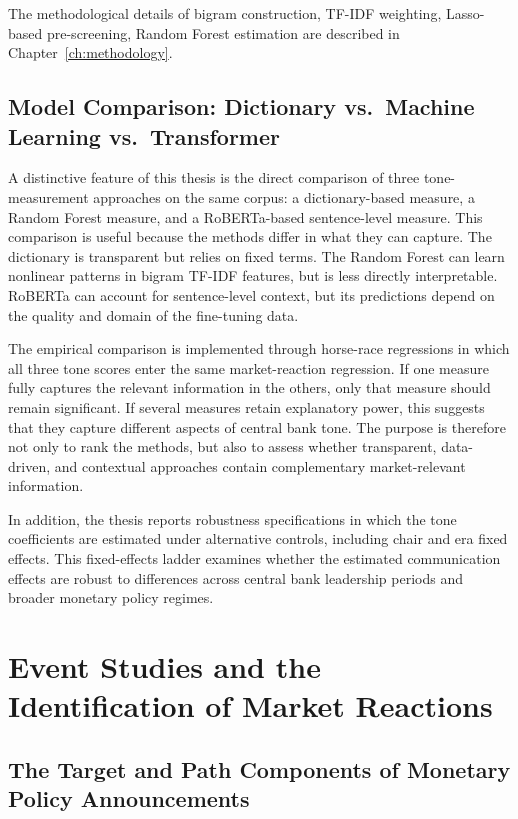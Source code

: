 The methodological details of bigram construction, TF-IDF weighting,
Lasso-based pre-screening, Random Forest estimation
are described in Chapter~\ref{ch:methodology}.

\subsection{Model Comparison: Dictionary vs.\ Machine Learning
vs.\ Transformer}

A distinctive feature of this thesis is the direct comparison of three
tone-measurement approaches on the same corpus: a dictionary-based
measure, a Random Forest measure, and a RoBERTa-based sentence-level
measure. This comparison is useful because the methods differ in what
they can capture. The dictionary is transparent but relies on fixed
terms. The Random Forest can learn nonlinear patterns in bigram TF-IDF
features, but is less directly interpretable. RoBERTa can account for
sentence-level context, but its predictions depend on the quality and
domain of the fine-tuning data.

The empirical comparison is implemented through horse-race regressions
in which all three tone scores enter the same market-reaction
regression. If one measure fully captures the relevant information in
the others, only that measure should remain significant. If several
measures retain explanatory power, this suggests that they capture
different aspects of central bank tone. The purpose is therefore not only
to rank the methods, but also to assess whether transparent,
data-driven, and contextual approaches contain complementary
market-relevant information.

In addition, the thesis reports robustness specifications in which the
tone coefficients are estimated under alternative controls, including
chair and era fixed effects. This fixed-effects ladder examines whether
the estimated communication effects are robust to differences across
central bank leadership periods and broader monetary policy regimes.


\section{Event Studies and the Identification of Market Reactions}
\label{sec:lit_eventstudy}

\subsection{The Target and Path Components of Monetary Policy Announcements}

